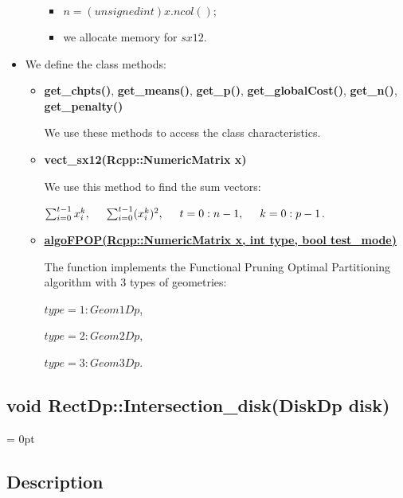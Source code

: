 \documentclass{report}
\begin{document}
\begin{itemize}
\begin{itemize}
\begin{itemize}
				\item $n = (unsigned int)x.ncol();$
				
				\item we allocate memory for $sx12$.
			\end{itemize}	
		\end{itemize}
		
		\item We define the class methods:
		
		\begin{itemize}
			\item {\bfseries get\_chpts()}, {\bfseries get\_means()}, {\bfseries get\_p()}, {\bfseries get\_globalCost()}, {\bfseries get\_n()}, {\bfseries get\_penalty()} 
			
			We use these  methods to access the class characteristics.
			
			\item {\bfseries vect\_sx12(Rcpp::NumericMatrix x)}
			
			We use this method to find the sum vectors:
			
			 $\sum_{i=0}^{t-1}x^k_i, \hspace*{5mm}  \sum_{i=0}^{t-1} (x^k_i)^2, \hspace*{5mm} t = 0:n-1, \hspace*{5mm} k = 0:p-1$.
			
			\item \hyperref [algoFPOP] {\bfseries algoFPOP(Rcpp::NumericMatrix x, int type, bool test\_mode)} 
			
			The function implements the Functional Pruning Optimal Partitioning algorithm with 3 types of geometries: 
			
			$type = 1: Geom1Dp$,
			
			$type = 2: Geom2Dp$,
			 
			$type = 3: Geom3Dp$.
		\end{itemize}
	\end{itemize}

\label{Intersection}	
\begin{center} 
	\section*{void RectDp::Intersection\_disk(DiskDp disk)}
\end{center}

\parindent = 0pt
\subsection*{Description}
\end{document}

